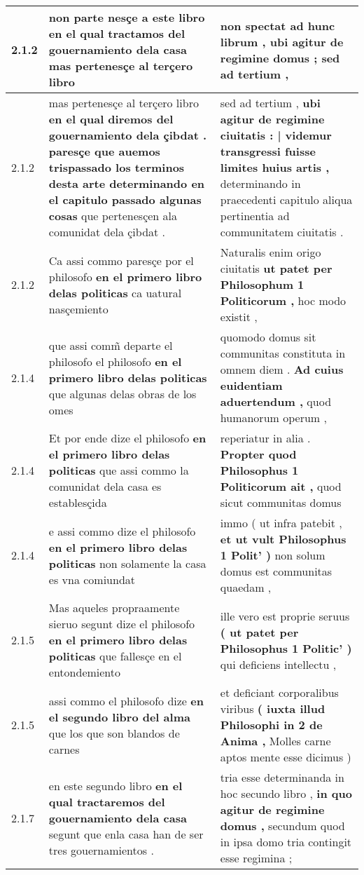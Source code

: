 \begin{tabular}{|p{1cm}|p{6.5cm}|p{6.5cm}|}
2.1.2 & non parte nesçe a este libro \textbf{ en el qual tractamos del gouernamiento dela casa } mas pertenesçe al terçero libro & non spectat ad hunc librum , \textbf{ ubi agitur de regimine domus ; } sed ad tertium , \\\hline
2.1.2 & mas pertenesçe al terçero libro \textbf{ en el qual diremos del gouernamiento dela çibdat . paresçe que auemos trispassado los terminos desta arte determinando en el capitulo passado algunas cosas } que pertenesçen ala comunidat dela çibdat . & sed ad tertium , \textbf{ ubi agitur de regimine ciuitatis : | videmur transgressi fuisse limites huius artis , } determinando in praecedenti capitulo aliqua pertinentia ad communitatem ciuitatis . \\\hline
2.1.2 & Ca assi commo paresçe por el philosofo \textbf{ en el primero libro delas politicas } ca uatural nasçemiento & Naturalis enim origo ciuitatis \textbf{ ut patet per Philosophum 1 Politicorum , } hoc modo existit , \\\hline
2.1.4 & que assi comm̃ departe el philosofo el philosofo \textbf{ en el primero libro delas politicas } que algunas delas obras de los omes & quomodo domus sit communitas constituta in omnem diem . \textbf{ Ad cuius euidentiam aduertendum , } quod humanorum operum , \\\hline
2.1.4 & Et por ende dize el philosofo \textbf{ en el primero libro delas politicas } que assi commo la comunidat dela casa es establesçida & reperiatur in alia . \textbf{ Propter quod Philosophus 1 Politicorum ait , } quod sicut communitas domus \\\hline
2.1.4 & e assi commo dize el philosofo \textbf{ en el primero libro delas politicas } non solamente la casa es vna comiundat & immo ( ut infra patebit , \textbf{ et ut vult Philosophus 1 Polit’ ) } non solum domus est communitas quaedam , \\\hline
2.1.5 & Mas aqueles propraamente sieruo segunt dize el philosofo \textbf{ en el primero libro delas politicas } que fallesçe en el entondemiento & ille vero est proprie seruus \textbf{ ( ut patet per Philosophus 1 Politic’ ) } qui deficiens intellectu , \\\hline
2.1.5 & assi commo el philosofo dize \textbf{ en el segundo libro del alma } que los que son blandos de carnes & et deficiant corporalibus viribus \textbf{ ( iuxta illud Philosophi in 2 de Anima , } Molles carne aptos mente esse dicimus ) \\\hline
2.1.7 & en este segundo libro \textbf{ en el qual tractaremos del gouernamiento dela casa } segunt que enla casa han de ser tres gouernamientos . & tria esse determinanda in hoc secundo libro , \textbf{ in quo agitur de regimine domus , } secundum quod in ipsa domo tria contingit esse regimina ; \\\hline

\end{tabular}
